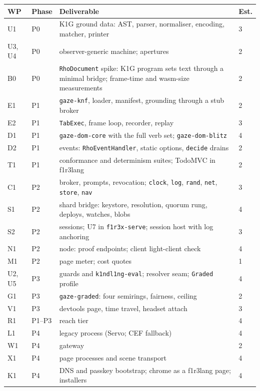 \documentclass[11pt]{article}
\theoremstyle{definition}
\theoremstyle{remark}
\newcommand{\fl}{f1r3lang}
\newcommand{\code}[1]{\texttt{#1}}
\begin{document}
\begin{center}\small
\renewcommand{\arraystretch}{1.15}
\begin{tabularx}{\linewidth}{@{}p{1.1cm}p{0.9cm}X p{1.1cm}@{}}
\toprule
WP & Phase & Deliverable & Est.\\
\midrule
U1 & P0 & K1G ground data: AST, parser, normaliser, encoding, matcher, printer & 3\\
U3, U4 & P0 & observer-generic machine; apertures & 2\\
B0 & P0 & \code{RhoDocument} spike: K1G program sets text through a minimal bridge; frame-time and wasm-size measurements & 2\\
E1 & P1 & \code{gaze-knf}, loader, manifest, grounding through a stub broker & 2\\
E2 & P1 & \code{TabExec}, frame loop, recorder, replay & 3\\
D1 & P1 & \code{gaze-dom-core} with the full verb set; \code{gaze-dom-blitz} & 4\\
D2 & P1 & events: \code{RhoEventHandler}, static options, \code{decide} drains & 2\\
T1 & P1 & conformance and determinism suites; TodoMVC in \fl{} & 2\\
C1 & P2 & broker, prompts, revocation; \code{clock}, \code{log}, \code{rand}, \code{net}, \code{store}, \code{nav} & 3\\
S1 & P2 & shard bridge: keystore, resolution, quorum rung, deploys, watches, blobs & 4\\
S2 & P2 & sessions; U7 in \code{f1r3x-serve}; session host with log anchoring & 3\\
N1 & P2 & node: proof endpoints; client light-client check & 4\\
M1 & P2 & page meter; cost quotes & 1\\
U2, U5 & P3 & guards and \code{k1ndl1ng-eval}; resolver seam; \code{Graded} profile & 4\\
G1 & P3 & \code{gaze-graded}: four semirings, fairness, ceiling & 2\\
V1 & P3 & devtools page, time travel, headset attach & 3\\
R1 & P1--P3 & reach tier & 4\\
L1 & P4 & legacy process (Servo; CEF fallback) & 4\\
W1 & P4 & gateway & 2\\
X1 & P4 & page processes and scene transport & 4\\
K1 & P4 & DNS and passkey bootstrap; chrome as a \fl{} page; installers & 4\\
\bottomrule
\end{tabularx}
\end{center}
\end{document}
